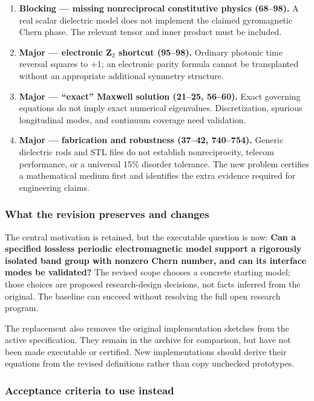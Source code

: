 \documentclass[
  11pt,
]{article}
\begin{document}
\begin{enumerate}
\def\labelenumi{\arabic{enumi}.}
\item
  \textbf{Blocking --- missing nonreciprocal constitutive physics
  (68--98).} A real scalar dielectric model does not implement the
  claimed gyromagnetic Chern phase. The relevant tensor and inner
  product must be included.
\item
  \textbf{Major --- electronic Z\ensuremath{{}_{2}} shortcut (95--98).}
  Ordinary photonic time reversal squares to +1; an electronic parity
  formula cannot be transplanted without an appropriate additional
  symmetry structure.
\item
  \textbf{Major --- ``exact'' Maxwell solution (21--25, 56--60).} Exact
  governing equations do not imply exact numerical eigenvalues.
  Discretization, spurious longitudinal modes, and continuum coverage
  need validation.
\item
  \textbf{Major --- fabrication and robustness (37--42, 740--754).}
  Generic dielectric rods and STL files do not establish nonreciprocity,
  telecom performance, or a universal 15\% disorder tolerance. The new
  problem certifies a mathematical medium first and identifies the extra
  evidence required for engineering claims.
\end{enumerate}

\subsubsection{What the revision preserves and changes}

The central motivation is retained, but the executable question is now:
\textbf{Can a specified lossless periodic electromagnetic model support
a rigorously isolated band group with nonzero Chern number, and can its
interface modes be validated?} The revised scope chooses a concrete
starting model; those choices are proposed research-design decisions,
not facts inferred from the original. The baseline can succeed without
resolving the full open research program.

The replacement also removes the original implementation sketches from
the active specification. They remain in the archive for comparison, but
have not been made executable or certified. New implementations should
derive their equations from the revised definitions rather than copy
unchecked prototypes.

\subsubsection{Acceptance criteria to use instead}
\end{document}
